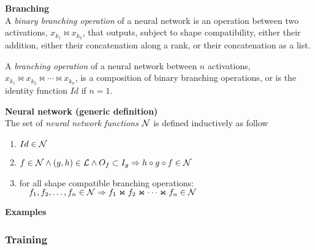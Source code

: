 \begin{definition}\textbf{Branching}\\
A \emph{binary branching operation} of a neural network is an operation between two activations, $x_{k_1} \Join x_{k_2}$, that outputs, subject to shape compatibility, either their addition, either their concatenation along a rank, or their concatenation as a list.

A \emph{branching operation} of a neural network between $n$ activations, $x_{k_1} \Join x_{k_2} \Join \cdots \Join x_{k_n}$, is a composition of binary branching operations, or is the identity function $Id$ if $n = 1$.
\end{definition}

\begin{definition}\textbf{Neural network (generic definition)}\\
The set of \emph{neural network functions} $\mathcal{N}$ is defined inductively as follow
\begin{enumerate}
  \item $Id \in \mathcal{N}$
  \item $f \in \mathcal{N} \wedge (g,h) \in \mathcal{L} \wedge O_f \subset I_g \Rightarrow h \circ g \circ f \in \mathcal{N}$
  \item for all shape compatible branching operations:\\
  $\quad f_1, f_2, \ldots, f_n \in \mathcal{N} \Rightarrow  f_1 \Join f_2 \Join \cdots \Join f_n \in \mathcal{N}$
\end{enumerate}
\label{def:nn2}
\end{definition}

\begin{remark}\textbf{Examples}\\
\label{rq:branching_ex}
\end{remark}

\subsubsection{Training}
\label{sec:training}


